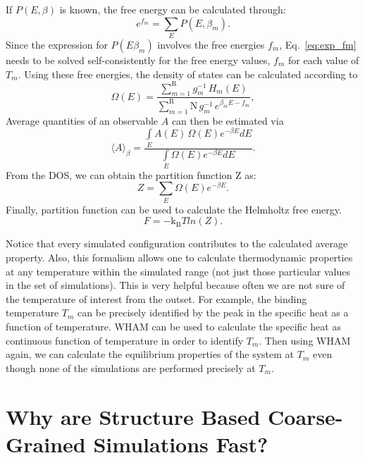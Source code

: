 \documentclass[../talant.diss.submit.tex]{subfiles}
\begin{document}
If $P(E,\beta)$ is known, the free energy can be calculated through:
\begin{equation}
  \label{eq:exp_fm}
  e^{f_m} = \sum_{E} P(E,\beta_{m}).
\end{equation}
%
%
Since the expression for $P(E\beta_m)$ involves the free energies $f_m$, 
Eq.~\ref{eq:exp_fm} needs to be solved self-consistently for the free energy
values, $f_m$ for each value of $T_m$.
Using these free energies, the density of states can be calculated according to
\begin{equation}
  \label{eq:DOS}
  \Omega (E) =  \frac{ \sum\limits_{m=1}^{\mathrm{R}}{g_{m}^{-1} \, H_m(E)}} {\sum\limits_{m=1}^{\mathrm{R}}{\mathrm{N}
      \, g_{m}^{-1} \, e^{\beta_{m} E - f_{m}}}},
\end{equation}
Average quantities of an observable $A$ can then be estimated via
\begin{equation}
  \label{eq:A_ave}
  \langle A \rangle_{\beta}  = \frac{\int\limits_{E}{ A(E) \, \Omega(E) e^{-\beta E} dE}}{\int\limits_{E}{\Omega(E)
      e^{-\beta E} dE}}.
\end{equation}
From the DOS, we can obtain the partition function Z as:
\begin{equation}
  \label{eq:parti}
  Z = \sum\limits_{E}{\Omega(E) e^{-\beta E}}.
\end{equation}
Finally, partition function can be used to calculate the Helmholtz free energy.
%
\begin{equation}
  \label{eq:free_E}
  F = -\mathrm{k_B} T ln(Z).
\end{equation}
%

Notice that every simulated configuration contributes to the calculated average property. 
Also, this formalism allows one to calculate thermodynamic properties at any temperature within the
simulated range (not just those particular values in the set of simulations).
This is very helpful because often we are not sure of the temperature of interest
from the outset. For example,
the binding temperature $T_m$ can be precisely identified by the peak in the
specific heat as a function of temperature. WHAM can be used to calculate the specific heat as continuous function of temperature in order to identify $T_m$. Then using WHAM again,  we can calculate the equilibrium properties
of the system at $T_m$ even though none of the simulations are performed precisely at $T_m$.

%
\section{\textbf{Why are Structure Based Coarse-Grained Simulations Fast?}}\label{sect:two_ten}
\end{document}

